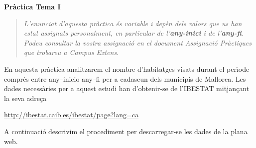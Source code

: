 \documentclass[11pt]{article}
\begin{document}
\vspace{0.3cm}
\noindent
\textbf{Pr\`actica Tema I}

\vspace{0.3cm}


\begin{quotation}
\textit{L'enunciat d'aquesta pr\`actica \'es variable i dep\`en dels valors que us han estat assignats personalment, en particular de l'\textbf{any-inici} i
de l'\textbf{any-fi}. Podeu consultar la vostra assignaci\'o en el document \textit{Assignaci\'o Pr\`actiques} que trobareu a Campus Extens.}
\end{quotation}

En aquesta pr\`actica analitzarem el nombre d'habitatges visats durant el per\'{\i}ode compr\`es entre any--inicio any--fi per a cadascun dels municipis de Mallorca. Les dades necess\`aries per a aquest estudi han d'obtenir-se de l'IBESTAT mitjan\c{c}ant la seva adre\c{c}a 
\begin{center}
\url{http://ibestat.caib.es/ibestat/page?lang=ca}
\end{center}
A continuaci\'o descrivim el procediment per descarregar-se les dades de la plana web.
\end{document}
